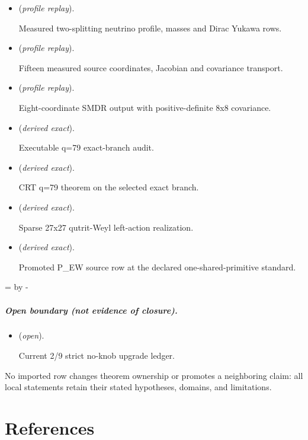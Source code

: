 \documentclass[11pt,openany]{book}
\begin{document}
\begin{itemize}
\item {} (\emph{profile replay}).\par Measured two-splitting neutrino profile, masses and Dirac Yukawa rows.
\item {} (\emph{profile replay}).\par Fifteen measured source coordinates, Jacobian and covariance transport.
\item {} (\emph{profile replay}).\par Eight-coordinate SMDR output with positive-definite 8x8 covariance.
\item {} (\emph{derived exact}).\par Executable q=79 exact-branch audit.
\item {} (\emph{derived exact}).\par CRT q=79 theorem on the selected exact branch.
\item {} (\emph{derived exact}).\par Sparse 27x27 qutrit-Weyl left-action realization.
\item {} (\emph{derived exact}).\par Promoted P\_EW source row at the declared one-shared-primitive standard.
\end{itemize}

\par\begingroup{}=\pagegoal\advance{} by -\pagetotal\ifdim\dimen0<7\baselineskip\newpage\fi\endgroup
\paragraph{Open boundary (not evidence of closure).}
\begin{itemize}
\setlength{\itemsep}{0.25em}
\item {} (\emph{open}).\par Current 2/9 strict no-knob upgrade ledger.
\end{itemize}

No imported row changes theorem ownership or promotes a neighboring claim: all local statements retain their stated hypotheses, domains, and limitations.

\chapter{References}
\end{document}
